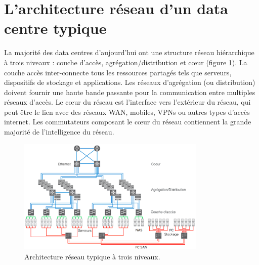 \section{L'architecture réseau d'un data centre typique}

La majorité des data centres d'aujourd'hui ont une structure réseau hiérarchique à trois niveaux : couche d'accès, agrégation/distribution et cœur (figure \ref{legacy_archi}). La couche accès inter-connecte tous les ressources partagés tels que serveurs, dispositifs de stockage et applications. Les réseaux d'agrégation (ou distribution) doivent fournir une haute bande passante pour la communication entre multiples réseaux d'accès. Le cœur du réseau est l'interface vers l'extérieur du réseau, qui peut être le lien avec des réseaux WAN, mobiles, VPNs ou autres types d'accès internet.  Les commutateurs composant le cœur du réseau contiennent la grande majorité de l'intelligence du réseau. 



\begin{figure}[h]
\begin{center}
\includegraphics[width=0.8\textwidth]{images/LegacyNetworkArchitecture} 
\caption{Architecture réseau typique à trois niveaux. \cite{cloudReadyNetworkJuniper}} \label{legacy_archi}
\end{center}
\end{figure}




